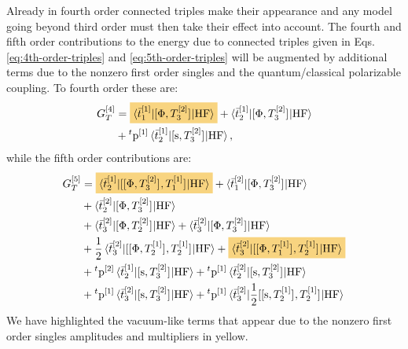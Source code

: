 Already in fourth order connected triples make their appearance and any
model going beyond third order must then take their effect into account.
The fourth and fifth order contributions to the energy due to connected
triples given in Eqs.
\eqref{eq:4th-order-triples} and \eqref{eq:5th-order-triples} will be
augmented by additional terms due to the nonzero first order singles and
the quantum/classical polarizable coupling.
To fourth order these are:
\begin{equation}\label{eq:triples-fourth-order}
  \begin{aligned}
  G_T^{[4]} &=
  \highlight{PMS130}{\braket{\tbar{1}^{[1]} | \commutator{\Phi}{T_3^{[2]}} | \mathrm{HF}}}
  + \braket{\tbar{2}^{[1]}| \commutator{\Phi}{T_3^{[2]}} | \mathrm{HF}} \\
  &+ {}^t\p^{[1]}\braket{\tbar{2}^{[1]} | \commutator{\s}{T_3^{[2]}} |
  \mathrm{HF}},
  \end{aligned}
\end{equation}
while the fifth order contributions are:
\begin{equation}\label{eq:triples-fifth-order}
  \begin{aligned}
  G_T^{[5]} &=
    \highlight{PMS130}{
    \braket{\tbar{2}^{[1]} |
    \commutator{\commutator{\Phi}{T_3^{[2]}}}{T_1^{[1]}}
    | \mathrm{HF}}
    }
    +
    \braket{\tbar{1}^{[2]} | \commutator{\Phi}{T_3^{[2]}} | \mathrm{HF}} \\
  &+ \braket{\tbar{2}^{[2]} | \commutator{\Phi}{T_3^{[2]}} | \mathrm{HF}} \\
  &+ \braket{\tbar{3}^{[2]} | \commutator{\Phi}{T_2^{[2]}} | \mathrm{HF}}
  + \braket{\tbar{3}^{[2]} | \commutator{\Phi}{T_3^{[2]}} | \mathrm{HF}}
  \\
    &+
    \frac{1}{2}\braket{\tbar{3}^{[2]} |
    \commutator{\commutator{\Phi}{T_2^{[1]}}}{T_2^{[1]}}
    | \mathrm{HF}}
  +
  \highlight{PMS130}{
    \braket{\tbar{3}^{[2]} |
    \commutator{\commutator{\Phi}{T_1^{[1]}}}{T_2^{[1]}}
    | \mathrm{HF}}
   }
   \\
   &+
    {}^t\p^{[2]}\braket{\tbar{2}^{[1]} | \commutator{\s}{T_3^{[2]}} | \mathrm{HF}}
  + {}^t\p^{[1]}\braket{\tbar{2}^{[2]} | \commutator{\s}{T_3^{[2]}} | \mathrm{HF}} \\
  &+ {}^t\p^{[1]}\braket{\tbar{3}^{[2]} | \commutator{\s}{T_3^{[2]}} | \mathrm{HF}}
  + {}^t\p^{[1]}\braket{\tbar{3}^{[2]} |
    \frac{1}{2}\commutator{\commutator{\s}{T_2^{[1]}}}{T_2^{[1]}}
    | \mathrm{HF}}
  \end{aligned}
\end{equation}
We have highlighted the vacuum-like terms that appear due to the nonzero
first order singles amplitudes and multipliers in yellow.

